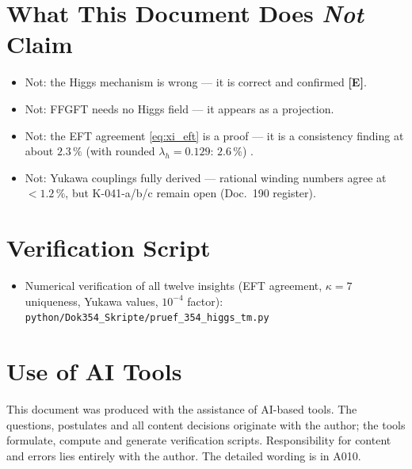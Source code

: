 \section{What This Document Does \emph{Not} Claim}

\begin{itemize}
  \item Not: the Higgs mechanism is wrong --- it is correct and confirmed \textbf{[E]}.
  \item Not: FFGFT needs no Higgs field --- it appears as a projection.
  \item Not: the EFT agreement \eqref{eq:xi_eft} is a proof --- it is a
    consistency finding at about $2.3\,\%$ (with rounded $\lambda_h = 0.129$: $2.6\,\%$) \KM.
  \item Not: Yukawa couplings fully derived --- rational winding numbers agree
    at $<1.2\,\%$, but K-041-a/b/c remain open (Doc.~190 register).
\end{itemize}

\section{Verification Script}

\begin{itemize}[leftmargin=2em,itemsep=2pt,topsep=2pt]
  \item Numerical verification of all twelve insights (EFT agreement,
    $\kappa=7$ uniqueness, Yukawa values, $10^{-4}$ factor):
    \texttt{python/Dok354\_Skripte/pruef\_354\_higgs\_tm.py}
\end{itemize}

\section{Use of AI Tools}

This document was produced with the assistance of AI-based tools.
The questions, postulates and all content decisions originate with the author;
the tools formulate, compute and generate verification scripts.
Responsibility for content and errors lies entirely with the author.
The detailed wording is in A010.

